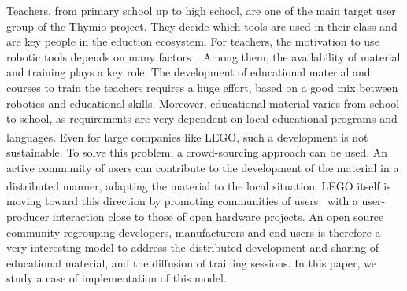 \documentclass[letterpaper, 10 pt, conference]{ieeeconf}  %
\begin{document}
Teachers, from primary school up to high school, are one of the main target user group of the Thymio project.
They decide which tools are used in their class and are key people in the eduction ecosystem.
For teachers, the motivation to use robotic tools depends on many factors~\cite{chevalier2016}.
Among them, the availability of material and training plays a key role.
The development of educational material and courses to train the teachers requires a huge effort, based on a good mix between robotics and educational skills. 
Moreover, educational material varies from school to school, as requirements are very dependent on local educational programs and languages. 
Even for large companies like LEGO\textsuperscript{\textregistered}, such a development is not sustainable. 
To solve this problem, a crowd-sourcing approach can be used.
An active community of users can contribute to the development of the material in a distributed manner, adapting the material to the local situation.
LEGO\textsuperscript{\textregistered} itself is moving toward this direction by promoting communities of users~\cite{Hienerth2014} with a user-producer interaction close to those of open hardware projects.
An open source community regrouping developers, manufacturers and end users is therefore a very interesting model to address the distributed development and sharing of educational material, and the diffusion of training sessions.
In this paper, we study a case of implementation of this model.
\end{document}
